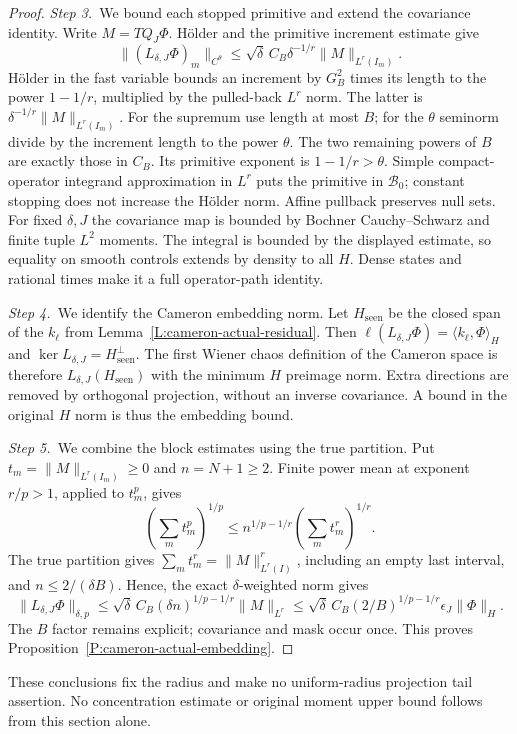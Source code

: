 \begin{proof}
  \medskip
  \noindent\textit{Step 3.~}We bound each stopped primitive and extend the
  covariance identity.
  Write $M = TQ_J\Phi$. H\"older and the primitive increment estimate give
  \begin{equation}\label{E:cameron-local-primitive-bound}
    \|(L_{\delta,J}\Phi)_m\|_{C^\theta}
    \le\sqrt\delta\,C_B\delta^{-1/r}\|M\|_{L^r(I_m)}.
  \end{equation}
  Hölder in the fast variable bounds an increment by $G_B^2$ times its length
  to the power $1-1/r$, multiplied by the pulled-back $L^r$ norm. The latter
  is $\delta^{-1/r}\|M\|_{L^r(I_m)}$. For the supremum use length at most $B$;
  for the $\theta$ seminorm divide by the increment length to the power
  $\theta$. The two remaining powers of $B$ are exactly those in $C_B$.
  Its primitive exponent is $1-1/r > \theta$. Simple compact-operator integrand
  approximation in $L^r$ puts the primitive in $\mathscr{B}_0$; constant
  stopping does not increase the H\"older norm. Affine pullback preserves null
  sets. For fixed $\delta,J$ the covariance map is bounded by Bochner
  Cauchy--Schwarz and finite tuple $L^2$ moments. The integral is bounded by the
  displayed estimate, so equality on smooth controls extends by density to all
  $H$. Dense states and rational times make it a full operator-path identity.


  \medskip
  \noindent\textit{Step 4.~}We identify the Cameron embedding norm.
  Let $H_{\mathrm{seen}}$ be the closed span of the $k_\ell$ from
  Lemma~\ref{L:cameron-actual-residual}. Then $\ell(L_{\delta,J}\Phi) = \langle
  k_\ell,\Phi\rangle_H$ and $\ker L_{\delta,J} = H_{\mathrm{seen}}^\perp$. The
  first Wiener chaos definition of the Cameron space is therefore
  $L_{\delta,J}(H_{\mathrm{seen}})$ with the minimum $H$ preimage norm. Extra
  directions are removed by orthogonal projection, without an inverse
  covariance. A bound in the original $H$ norm is thus the embedding bound.


  \medskip
  \noindent\textit{Step 5.~}We combine the block estimates using the true
  partition.
  Put $t_m = \|M\|_{L^r(I_m)} \ge 0$ and $n = N+1 \ge 2$. Finite power mean at
  exponent $r/p > 1$, applied to $t_m^p$, gives
  \[
    \left(\sum_m t_m^p\right)^{1/p}
    \le n^{1/p-1/r}\left(\sum_m t_m^r\right)^{1/r}.
  \]
  The true partition gives $\sum_m t_m^r = \|M\|_{L^r(I)}^r$, including an empty
  last interval, and $n \le 2/(\delta B)$. Hence, the exact $\delta$-weighted
  norm gives
  \[
    \|L_{\delta,J}\Phi\|_{\delta,p}
    \le\sqrt\delta\,C_B(\delta n)^{1/p-1/r}\|M\|_{L^r}
    \le\sqrt\delta\,C_B(2/B)^{1/p-1/r}
    \epsilon_J\|\Phi\|_H.
  \]
  The $B$ factor remains explicit; covariance and mask occur once. This proves
  Proposition~\ref{P:cameron-actual-embedding}.
\end{proof}

These conclusions fix the radius and make no uniform-radius projection tail
assertion. No concentration estimate or original moment upper bound follows from
this section alone.
